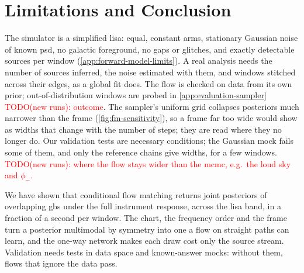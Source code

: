 \section{Limitations and Conclusion}
\label{sec:limitations}

The simulator is a simplified \ac{lisa}: equal, constant arms, stationary Gaussian noise of known
\ac{psd}, no galactic foreground, no gaps or glitches, and exactly \RelatedWorkSourcesWord{}
detectable sources per window (\cref{app:forward-model-limits}). A real analysis needs the number
of sources inferred, the noise estimated with them, and windows stitched across their edges, as a
global fit does. The flow is checked on data from its own prior; out-of-distribution windows are
probed in \cref{app:evaluation-sampler} \textcolor{red}{TODO(new runs): outcome}. The sampler's
uniform grid collapses posteriors much narrower than the frame (\cref{fig:fm-sensitivity}), so a
frame far too wide would show as widths that change with the number of steps; they are read where
they no longer do. Our validation tests are necessary
conditions; the Gaussian mock fails some of them, and only the reference chains give widths, for
a few windows. \textcolor{red}{TODO(new runs): where the flow stays wider than the
\acs{mcmc}, e.g.\ the loud sky and $\phi_-$.}

We have shown that conditional flow matching returns joint posteriors of overlapping \acp{gb}
under the full instrument response, across the \ac{lisa} band, in a fraction of a second per
window. The chart, the frequency order and the frame turn a posterior multimodal by symmetry into one a
flow on straight paths can learn, and the one-way network makes each draw cost only the source
stream. Validation needs tests in data space and known-answer mocks: without them, flows that
ignore the data pass.
